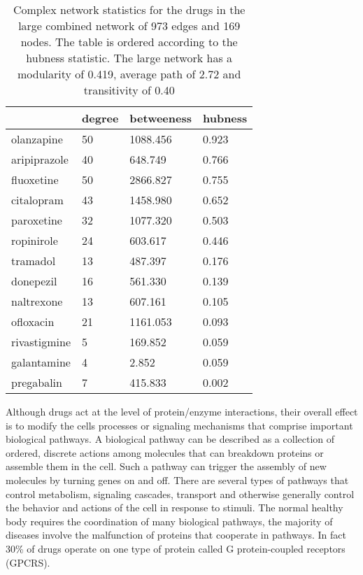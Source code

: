 \documentclass[preprint,12pt]{elsarticle}
\begin{document}
\begin{table}[h]
\centering \caption{Complex network statistics for the drugs in the large combined network of 973 edges and 169 nodes. The table is ordered according to the hubness statistic. The large network has a modularity of 0.419, average path of 2.72 and transitivity of 0.40}\label{giant1}
\scriptsize
\begin{tabular}{llll}
  \hline
 & degree & betweeness & hubness \\ 
  \hline
  olanzapine & 50 & 1088.456 & 0.923 \\ 
  aripiprazole & 40 & 648.749 & 0.766 \\ 
  fluoxetine & 50 & 2866.827 & 0.755 \\ 
  citalopram & 43 & 1458.980 & 0.652 \\ 
  paroxetine & 32 & 1077.320 & 0.503 \\ 
  ropinirole & 24 & 603.617 & 0.446 \\ 
  tramadol & 13 & 487.397 & 0.176 \\ 
  donepezil & 16 & 561.330 & 0.139 \\ 
  naltrexone & 13 & 607.161 & 0.105 \\ 
  ofloxacin & 21 & 1161.053 & 0.093 \\ 
  rivastigmine & 5 & 169.852 & 0.059 \\ 
  galantamine & 4 & 2.852 & 0.059 \\ 
  pregabalin & 7 & 415.833 & 0.002 \\ 
   \hline
\end{tabular}
\end{table}
\normalsize



Although drugs act at the level of protein/enzyme interactions, their overall effect is to modify the cells processes or signaling mechanisms that comprise important biological pathways. A biological pathway can be described as a collection of ordered, discrete actions among molecules that can breakdown proteins or assemble them in the cell. Such a pathway can trigger the assembly of new molecules by turning genes on and off. There are several types of pathways that control metabolism, signaling cascades, transport and otherwise generally control the behavior and actions of the cell in response to stimuli. The normal healthy body requires the coordination of many biological pathways, the majority of diseases involve the malfunction of proteins that cooperate in pathways. In fact 30\% of drugs operate on one type of protein called G protein-coupled receptors (GPCRS). 
\end{document}
